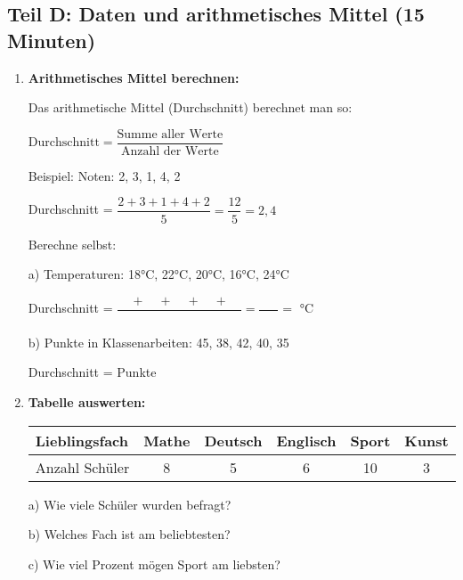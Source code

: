\subsection*{Teil D: Daten und arithmetisches Mittel (15 Minuten)}

\begin{enumerate}[label=\arabic*.]
    \item \textbf{Arithmetisches Mittel berechnen:}

    Das arithmetische Mittel (Durchschnitt) berechnet man so:

    $\text{Durchschnitt} = \dfrac{\text{Summe aller Werte}}{\text{Anzahl der Werte}}$

    \vspace{0.5cm}

    Beispiel: Noten: 2, 3, 1, 4, 2

    Durchschnitt = $\dfrac{2 + 3 + 1 + 4 + 2}{5} = \dfrac{12}{5} = 2,4$

    \vspace{0.5cm}

    Berechne selbst:

    a) Temperaturen: 18°C, 22°C, 20°C, 16°C, 24°C

    Durchschnitt = $\dfrac{\phantom{00} + \phantom{00} + \phantom{00} + \phantom{00} + \phantom{00}}{\phantom{0}} = \dfrac{\phantom{000}}{\phantom{0}} = $ \underline{\hspace{2cm}}°C

    \vspace{0.5cm}

    b) Punkte in Klassenarbeiten: 45, 38, 42, 40, 35

    Durchschnitt = \underline{\hspace{3cm}} Punkte

    \vspace{0.5cm}

    \item \textbf{Tabelle auswerten:}

    \begin{tabular}{|l|c|c|c|c|c|}
    \hline
    Lieblingsfach & Mathe & Deutsch & Englisch & Sport & Kunst \\
    \hline
    Anzahl Schüler & 8 & 5 & 6 & 10 & 3 \\
    \hline
    \end{tabular}

    a) Wie viele Schüler wurden befragt? \underline{\hspace{3cm}}

    b) Welches Fach ist am beliebtesten? \underline{\hspace{3cm}}

    c) Wie viel Prozent mögen Sport am liebsten? \underline{\hspace{3cm}}

\end{enumerate}